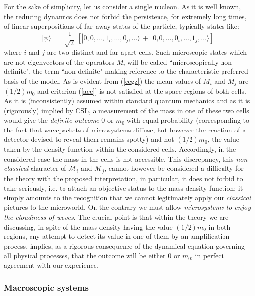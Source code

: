 \documentclass[12pt]{article}
\begin{document}
For the sake of simplicity, let us consider a single nucleon. As
it is well known, the reducing dynamics does not forbid the
persistence, for extremely long times, of linear superpositions of
far--away states of the particle, typically states like:
\begin{equation} \label{ecgz}
|\psi\rangle \; = \; \frac{1}{\sqrt{2}}\,\left[
|0,0,\ldots,1_{i},\ldots,0_{j},\ldots\rangle \, + \,
|0,0,\ldots,0_{i},\ldots,1_{j},\ldots\rangle \right]
\end{equation}
where $i$ and $j$ are two distinct and far apart cells. Such
microscopic states which are not eigenvectors of the operators
$M_{i}$ will be called ``microscopically non definite", the term
``non definite" making reference to the characteristic preferred
basis of the model. As is evident from (\ref{ecgz}) the mean
values of $M_{i}$ and $M_{j}$ are $(1/2)m_{0}$ and criterion
(\ref{acc}) is not satisfied at the space regions of both cells.
As it is (inconsistently) assumed within standard quantum
mechanics and as it is (rigorously) implied by CSL, a measurement
of the mass in one of these two cells would give the {\it definite
outcome} $0$ or $m_{0}$ with equal probability (corresponding to
the fact that wavepackets of microsystems diffuse, but however the
reaction of a detector devised to reveal them remains spotty) and
not $(1/2)m_{0}$, the value taken by the density function within
the considered cells. Accordingly, in the considered case the mass
in the cells is not accessible. This discrepancy, this {\it non
classical} character of ${\mathcal M}_{i}$ and ${\mathcal M}_{j}$,
cannot however be considered a difficulty for the theory with the
proposed interpretation, in particular, it does not forbid to take
seriously, i.e. to attach an objective status to the mass density
function; it simply amounts to the recognition  that we cannot
legitimately apply our {\it classical} pictures to the microworld.
On the contrary we must allow \cite{bellns} {\it microsystems to
enjoy the cloudiness of waves}. The crucial point is that within
the theory we are discussing, in spite of the mass density having
the value $(1/2)m_{0}$ in both regions, any attempt to detect its
value in one of them by an amplification process, implies, as a
rigorous consequence of the dynamical equation governing all
physical processes, that the outcome will be either $0$ or
$m_{0}$, in perfect agreement with our experience.

\subsubsection{Macroscopic systems} \label{sec1232}
\end{document}
